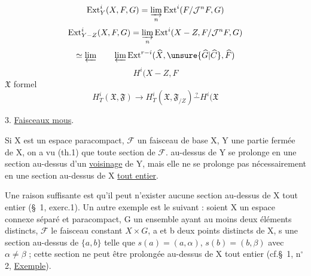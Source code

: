 \[
\operatorname{Ext}^i_Y(X,F,G)=\varinjlim_n\operatorname{Ext}^i(F/\mathcal J^nF,G)
\]
\margin{$\lim$}
\[
\operatorname{Ext}^i_{Y-Z}(X,F,G)=\varinjlim_n\operatorname{Ext}^i(X-Z,F/\mathcal J^nF,G)
\]
\noindent {}
\[
\simeq\varprojlim\qquad\varprojlim\operatorname{Ext}^{r-i}(\widehat X,\unsure{\widehat G|\widehat C},\widehat F)
\]
\[
H^i(X-Z,F
\]
\noindent $\mathfrak X$  formel
\[
H^i_T(\mathfrak X,\mathfrak F)\longrightarrow H^i_T(\mathfrak X,\mathfrak F_{/Z})\overset{?}{\mathrel{-}}H^i(\mathfrak X
\]

3. \uline{Faisceaux mous}.

Si X est un espace paracompact, $\mathcal F$ un faisceau de base X, Y une partie fermée de X, on a vu (th.1) que toute section de $\mathcal F$. au-dessus de Y se prolonge en une section au-dessus d'un \uline{voisinage} de Y, mais elle ne se prolonge pas nécessairement en une section au-dessus de X \uline{tout entier}.

Une raison suffisante est qu'il peut n'exister aucune section au-dessus de X tout entier (\S\ 1, exerc.1). Un autre exemple est le suivant : soient X un espace connexe séparé et paracompact, G un ensemble ayant au moins deux éléments distincts, $\mathcal F$ le faisceau constant $X\times G$, a et b deux points distincts de X, s une section au-dessus de $\{a,b\}$ telle que $s(a)=(a,\alpha)$, $s(b)=(b,\beta)$ avec $\alpha\neq\beta$ ; cette section ne peut être prolongée au-dessus de X tout entier (cf.\S\ 1, n$^\circ$ 2, \uline{Exemple}).

